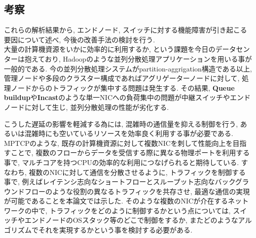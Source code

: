\documentclass[11pt, a4paper, twocolumn]{jsarticle}
\begin{document}
\subsection{考察}
\label{sec:analysis}
これらの解析結果から, エンドノード, スイッチに対する機能障害が引き起こる要因について述べ, 今後の改善手法の検討を行う.\\
大量の計算機資源をいかに効率的に利用するか, という課題を今日のデータセンターは抱えており,
Hadoopのような並列分散処理アプリケーションを用いる事が一般的である.
今の並列分散処理システムがpartition-aggrigation構造である以上, 管理ノードや多段のクラスター構成であればアグリゲーターノードに対して, 処理ノードからのトラフィックが集中する問題は発生する.
その結果, {\bf Queue buildup}や{\bf Incast}のような単一NICへの負荷集中の問題が中継スイッチやエンドノードに対して生じ, 並列分散処理の性能が劣化する.

こうした遅延の影響を軽減する為には, 混雑時の通信量を抑える制御を行う, あるいは混雑時にも空いているリソースを効率良く利用する事が必要である.
MPTCPのような, 既存の計算機資源に対して複数NICを刺して性能向上を目指すことで, 複数のフローからデータを受信する際に異なる物理ポートを利用する事で,
マルチコアを持つCPUの効率的な利用につなげられると期待している.
すなわち, 複数のNICに対して通信を分散させるように, トラフィックを制御する事で,
例えばレイテンシ志向なショートフローとスループット志向なバックグラウンドフローのような役割の異なるトラフィックを共存させ,
最適な通信の実現が可能であることを本論文では示した.
そのような複数のNICが介在するネットワークの中で, トラフィックをどのように制御するかという点については,
スイッチやエンドノードのOSスタック等のどこで制御をするか, またどのようなアルゴリズムでそれを実現するかという事を検討する必要がある.


%
%
\end{document}

